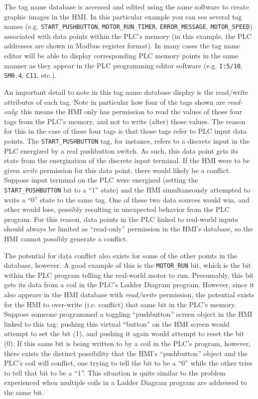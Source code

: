 The tag name database is accessed and edited using the same software to create graphic images in the HMI.  In this particular example you can see several tag names (e.g. \texttt{START\_PUSHBUTTON}, \texttt{MOTOR\_RUN\_TIMER}, \texttt{ERROR\_MESSAGE}, \texttt{MOTOR\_SPEED}) associated with data points within the PLC's memory (in this example, the PLC addresses are shown in Modbus register format).  In many cases the tag name editor will be able to display corresponding PLC memory points in the same manner as they appear in the PLC programming editor software (e.g. \texttt{I:5/10}, \texttt{SM0.4}, \texttt{C11}, etc.).

\vskip 10pt

An important detail to note in this tag name database display is the read/write attributes of each tag.  Note in particular how four of the tags shown are \textit{read-only}: this means the HMI only has permission to read the values of those four tags from the PLC's memory, and not to write (alter) those values.  The reason for this in the case of these four tags is that those tags refer to PLC input data points.  The \texttt{START\_PUSHBUTTON} tag, for instance, refers to a discrete input in the PLC energized by a real pushbutton switch.  As such, this data point gets its state from the energization of the discrete input terminal.  If the HMI were to be given \textit{write} permission for this data point, there would likely be a conflict.  Suppose input terminal on the PLC were energized (setting the \texttt{START\_PUSHBUTTON} bit to a ``1'' state) and the HMI simultaneously attempted to write a ``0'' state to the same tag.  One of these two data sources would win, and other would lose, possibly resulting in unexpected behavior from the PLC program.  For this reason, data points in the PLC linked to real-world inputs should always be limited as ``read-only'' permission in the HMI's database, so the HMI cannot possibly generate a conflict.

The potential for data conflict also exists for some of the other points in the database, however.  A good example of this is the \texttt{MOTOR\_RUN} bit, which is the bit within the PLC program telling the real-world motor to run.  Presumably, this bit gets its data from a coil in the PLC's Ladder Diagram program.  However, since it also appears in the HMI database with \textit{read/write} permission, the potential exists for the HMI to over-write (i.e. conflict) that same bit in the PLC's memory.  Suppose someone programmed a toggling ``pushbutton'' screen object in the HMI linked to this tag: pushing this virtual ``button'' on the HMI screen would attempt to set the bit (1), and pushing it again would attempt to reset the bit (0).  If this same bit is being written to by a coil in the PLC's program, however, there exists the distinct possibility that the HMI's ``pushbutton'' object and the PLC's coil will conflict, one trying to tell the bit to be a ``0'' while the other tries to tell that bit to be a ``1''.  This situation is quite similar to the problem experienced when multiple coils in a Ladder Diagram program are addressed to the same bit.

